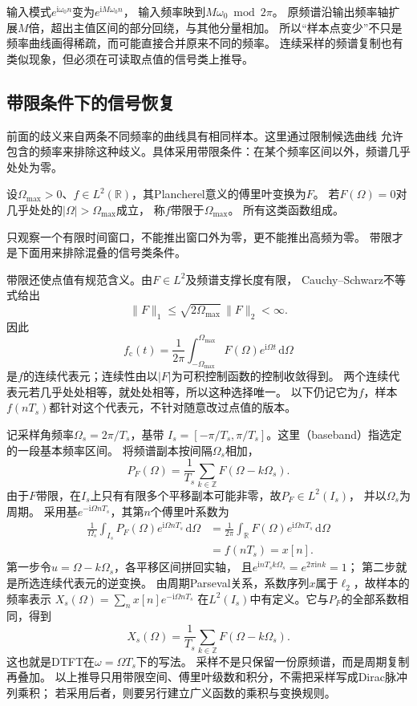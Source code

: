 输入模式$e^{\mathrm i\omega_0n}$变为$e^{\mathrm iM\omega_0n}$，
输入频率映到$M\omega_0\bmod2\pi$。
原频谱沿输出频率轴扩展$M$倍，超出主值区间的部分回绕，与其他分量相加。
所以“样本点变少”不只是频率曲线画得稀疏，而可能直接合并原来不同的频率。
连续采样的频谱复制也有类似现象，但必须在可读取点值的信号类上推导。

\subsection{带限条件下的信号恢复}
\label{sec:signal-bandlimited-recovery}

前面的歧义来自两条不同频率的曲线具有相同样本。这里通过限制候选曲线
允许包含的频率来排除这种歧义。具体采用带限条件：在某个频率区间以外，频谱几乎处处为零。
\begin{definition}[平方可积带限信号]
  \label{def:signal-analysis-bandlimited-space}
  设$\Omega_{\max}>0$、$f\in L^2(\mathbb R)$，其Plancherel意义的傅里叶变换为$F$。
  若$F(\Omega)=0$对几乎处处的$|\Omega|>\Omega_{\max}$成立，
  称$f$带限于$\Omega_{\max}$。
  所有这类函数组成。
\end{definition}
只观察一个有限时间窗口，不能推出窗口外为零，更不能推出高频为零。
带限才是下面用来排除混叠的信号类条件。

带限还使点值有规范含义。由$F\in L^2$及频谱支撑长度有限，
Cauchy--Schwarz不等式给出
\[
  \|F\|_1\leq\sqrt{2\Omega_{\max}}\,\|F\|_2<\infty.
\]
因此
\[
  f_{\mathrm c}(t)=\frac1{2\pi}\int_{-\Omega_{\max}}^{\Omega_{\max}}
  F(\Omega)e^{\mathrm i\Omega t}\,\mathrm d\Omega
\]
是$f$的连续代表元；连续性由以$|F|$为可积控制函数的控制收敛得到。
两个连续代表元若几乎处处相等，就处处相等，所以这种选择唯一。
以下仍记它为$f$，样本$f(nT_s)$都针对这个代表元，不针对随意改过点值的版本。

记采样角频率$\Omega_s=2\pi/T_s$，基带
$I_s=[-\pi/T_s,\pi/T_s]$。这里（baseband）指选定的一段基本频率区间。
将频谱副本按间隔$\Omega_s$相加，
\[
  P_F(\Omega)=\frac1{T_s}\sum_{k\in\mathbb Z}F(\Omega-k\Omega_s).
\]
由于$F$带限，在$I_s$上只有有限多个平移副本可能非零，故$P_F\in L^2(I_s)$，
并以$\Omega_s$为周期。
采用基$e^{-\mathrm i\Omega nT_s}$，其第$n$个傅里叶系数为
\begin{align*}
  \frac1{\Omega_s}\int_{I_s}P_F(\Omega)e^{\mathrm i\Omega nT_s}\,\mathrm d\Omega
  &=\frac1{2\pi}\int_{\mathbb R}F(\Omega)e^{\mathrm i\Omega nT_s}\,\mathrm d\Omega\\
  &=f(nT_s)=x[n].
\end{align*}
第一步令$u=\Omega-k\Omega_s$，各平移区间拼回实轴，
且$e^{\mathrm inT_sk\Omega_s}=e^{2\pi\mathrm ink}=1$；
第二步就是所选连续代表元的逆变换。
由周期Parseval关系，系数序列$x$属于$\ell_2$，故样本的频率表示
$X_s(\Omega)=\sum_n x[n]e^{-\mathrm i\Omega nT_s}$
在$L^2(I_s)$中有定义。它与$P_F$的全部系数相同，得到
\begin{equation}
  X_s(\Omega)=\frac1{T_s}\sum_{k\in\mathbb Z}F(\Omega-k\Omega_s).
  \label{eq:signal-analysis-spectral-replication}
\end{equation}
这也就是DTFT在$\omega=\Omega T_s$下的写法。
采样不是只保留一份原频谱，而是周期复制再叠加。
以上推导只用带限空间、傅里叶级数和积分，不需把采样写成Dirac脉冲列乘积；
若采用后者，则要另行建立广义函数的乘积与变换规则。

